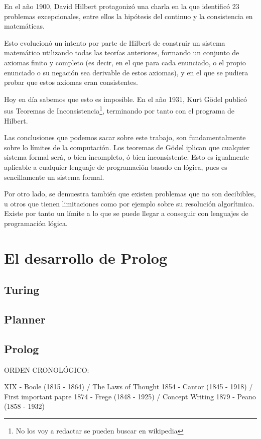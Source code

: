 \documentclass{article}
\begin{document}
En el año 1900, David Hilbert protagonizó una charla en la que identificó 23 problemas excepcionales, entre ellos la hipótesis del continuo y la consistencia en matemáticas.

Esto evolucionó un intento por parte de Hilbert de construir un sistema matemático utilizando todas las teorías anteriores, formando un conjunto de axiomas finito y completo (es decir, en el que para cada enunciado, o el propio enunciado o su negación sea derivable de estos axiomas), y en el que se pudiera probar que estos axiomas eran consistentes.

Hoy en día sabemos que esto es imposible. En el año 1931, Kurt Gödel publicó sus Teoremas de Inconsistencia\footnote{No los voy a redactar se pueden buscar en wikipedia}, terminando por tanto con el programa de Hilbert\cite{blackburn2005oxford}.

Las conclusiones que podemos sacar sobre este trabajo, son fundamentalmente sobre lo límites de la computación. Los teoremas de Gödel iplican que cualquier sistema formal será, o bien incompleto, ó bien inconsistente. Esto es igualmente aplicable a cualquier lenguaje de programación basado en lógica, pues es sencillamente un sistema formal.

Por otro lado, se demuestra también que existen problemas que no son decibibles, u otros que tienen limitaciones como por ejemplo sobre su resolución algorítmica. Existe por tanto un límite a lo que se puede llegar a conseguir con lenguajes de programación lógica.

\section{El desarrollo de Prolog}

\subsection{Turing}

\subsection{Planner}

\subsection{Prolog}




ORDEN CRONOLÓGICO:

XIX 
- Boole (1815 - 1864) / The Laws of Thought 1854
- Cantor (1845 - 1918) / First important papre 1874
- Frege (1848 - 1925) / Concept Writing 1879
- Peano (1858 - 1932)
\end{document}
